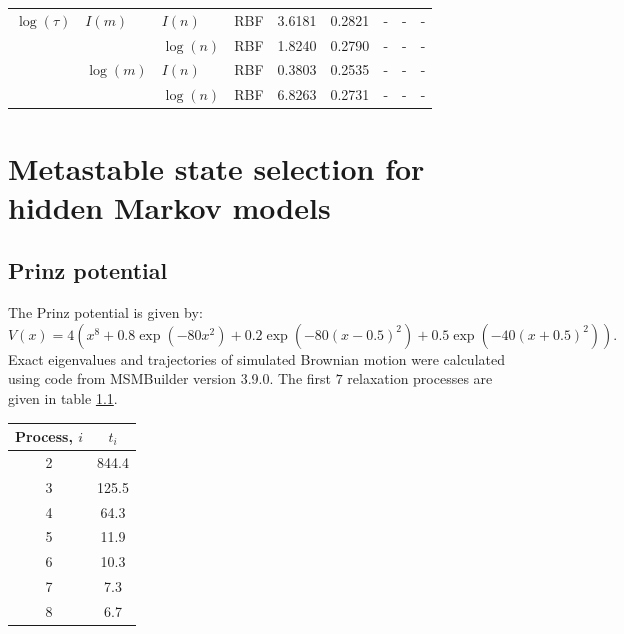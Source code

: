 \begin{table}
\begin{tabularx}{1\textwidth}{|llllrr >{\raggedright\arraybackslash}X>{\raggedright\arraybackslash}X>{\raggedright\arraybackslash}X|}
    $\log({\tau})$ & $I({m})$ & $I({n})$ & RBF &  3.6181 & 0.2821 &           - &           - &            - \\
                   &             & $\log({n})$ & RBF &  1.8240 & 0.2790 &           - &           - &            - \\
                   & $\log({m})$ & $I({n})$ & RBF &  0.3803 & 0.2535 &           - &           - &            - \\
                   &             & $\log({n})$ & RBF &  6.8263 & 0.2731 &           - &           - &            - \\
    \hline
    \end{tabularx}
\end{table}

\chapter{Metastable state selection for hidden Markov models}\label{app:hmm}

\section{Prinz potential}\label{sec:app_hmm_prinz}
 The Prinz potential is given by: 
\begin{equation}\label{eqn:prinz_pot}
       V(x) = 4\left(x^8 + 0.8 \exp{\left(-80 x^2\right)} + 0.2 \exp{\left(-80 (x-0.5)^2\right)} + 0.5\exp{\left(-40 (x+0.5)^2\right)}\right).
\end{equation}
Exact eigenvalues and trajectories of simulated Brownian motion were calculated using code from MSMBuilder \cite{beauchampMSMBuilder2ModelingConformational2011} version 3.9.0.  The first $7$ relaxation processes are given in table \ref{tab:prinz_its_exact}. 
\begin{table}
    \centering
    \begin{tabular}{|c|c|}
        \hline
        Process, $i$ & $t_i$ \\
        \hline\hline
         2 & 844.4 \\
         3 & 125.5 \\
         4 & 64.3 \\
         5 & 11.9 \\
         6 & 10.3 \\
         7 & 7.3 \\
         8 & 6.7 \\
         \hline
    \end{tabular}
    \label{tab:prinz_its_exact}
\end{table}

